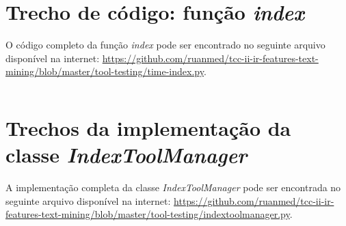 \begin{apendicesenv}
    \partapendices
    
    \chapter{Trecho de código: função \textit{index}} \label{apên:função-index}
    O código completo da função \textit{index} pode ser encontrado no seguinte arquivo disponível na internet: \hyperlink{https://github.com/ruanmed/tcc-ii-ir-features-text-mining/blob/master/tool-testing/time-index.py}{https://github.com/ruanmed/tcc-ii-ir-features-text-mining/blob/master/tool-testing/time-index.py}.
    \inputminted[bgcolor=bg, breakbytoken,
                tabsize=2, baselinestretch=1, breaklines]{python}{codes/function-index.py}
    
    \chapter{Trechos da implementação da classe \textit{IndexToolManager}} \label{apên:implementação-indextoolmanager}
    A implementação completa da classe \textit{IndexToolManager} pode ser encontrada no seguinte arquivo disponível na internet: \hyperlink{https://github.com/ruanmed/tcc-ii-ir-features-text-mining/blob/master/tool-testing/indextoolmanager.py}{https://github.com/ruanmed/tcc-ii-ir-features-text-mining/blob/master/tool-testing/indextoolmanager.py}.
    \inputminted[bgcolor=bg, breakbytoken,
                tabsize=2, baselinestretch=1, breaklines]{python}{codes/indextoolmanager.py}

\end{apendicesenv}
    